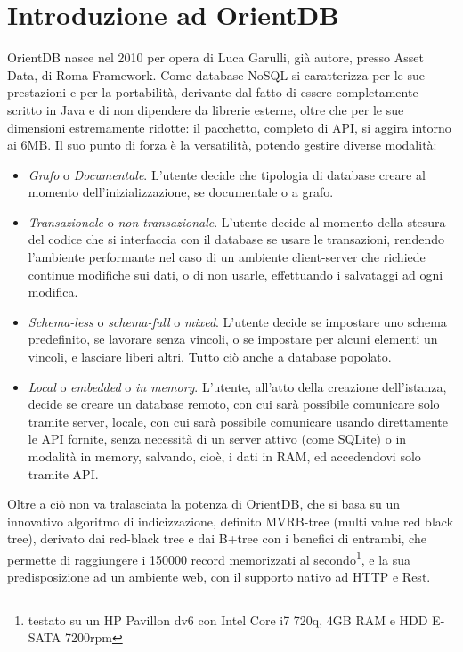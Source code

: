 \section{Introduzione ad OrientDB}
OrientDB nasce nel 2010 per opera di Luca Garulli, già autore, presso Asset Data, di Roma Framework. Come database NoSQL si caratterizza per le sue prestazioni e per la portabilità, derivante dal fatto di essere completamente scritto in Java e di non dipendere da librerie esterne, oltre che per le sue dimensioni estremamente ridotte: il pacchetto, completo di API, si aggira intorno ai 6MB.
Il suo punto di forza è la versatilità, potendo gestire diverse modalità:
\begin{itemize}
\item \emph{Grafo} o \emph{Documentale}. L'utente decide che tipologia di database creare al momento dell'inizializzazione, se documentale o a grafo.
\item \emph{Transazionale} o \emph{non transazionale}. L'utente decide al momento della stesura del codice che si interfaccia con il database se usare le transazioni, rendendo l'ambiente performante nel caso di un ambiente client-server che richiede continue modifiche sui dati, o di non usarle, effettuando i salvataggi ad ogni modifica.
\item \emph{Schema-less} o \emph{schema-full} o \emph{mixed}. L'utente decide se impostare uno schema predefinito, se lavorare senza vincoli, o se impostare per alcuni elementi un vincoli, e lasciare liberi altri. Tutto ciò anche a database popolato.
\item \emph{Local} o \emph{embedded} o \emph{in memory}. L'utente, all'atto della creazione dell'istanza, decide se creare un database remoto, con cui sarà possibile comunicare solo tramite server, locale, con cui sarà possibile comunicare usando direttamente le API fornite, senza necessità di un server attivo (come SQLite) o in modalità in memory, salvando, cioè, i dati in RAM, ed accedendovi solo tramite API.
\end{itemize}

Oltre a ciò non va tralasciata la potenza di OrientDB, che si basa su un innovativo algoritmo di indicizzazione, definito MVRB-tree (multi value red black tree), derivato dai red-black tree e dai B+tree con i benefici di entrambi, che permette di raggiungere i 150000 record memorizzati al secondo\footnote{testato su un HP Pavillon dv6 con Intel Core i7 720q, 4GB RAM e HDD E-SATA 7200rpm}, e la sua predisposizione ad un ambiente web, con il supporto nativo ad HTTP e Rest.

